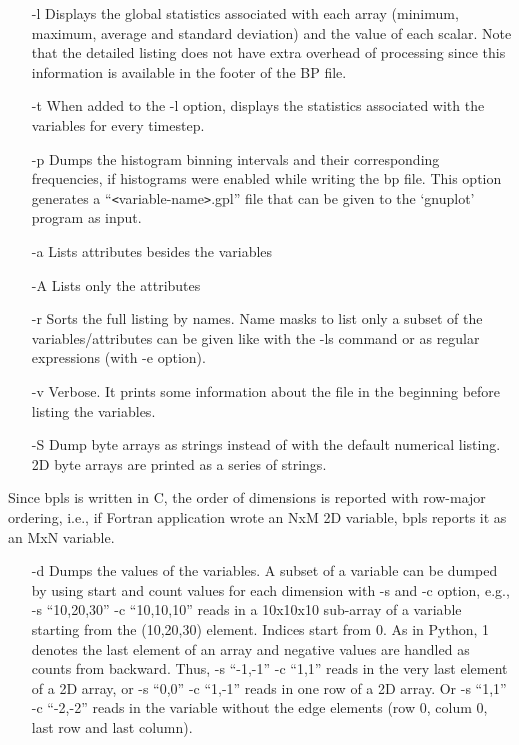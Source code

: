 \begin{itemize}
\item[-l]  Displays the global statistics associated with each array (minimum, maximum, 
average and standard deviation) and the value of each scalar. Note that the detailed 
listing does not have extra overhead of processing since this information is available 
in the footer of the BP file. 

\item[-t]  When added to the -l option, displays the statistics associated with the variables 
for every timestep. 

\item[-p] Dumps the histogram binning intervals and their corresponding frequencies, if 
histograms were enabled while writing the bp file. This option generates a ``\texttt{<}variable-name\texttt{>}.gpl'' 
file that can be given to the `gnuplot' program as input. 

\item[-a] Lists attributes besides the variables

\item[-A] Lists only the attributes

\item[-r] Sorts the full listing by names. Name masks to list only a subset of the variables/attributes 
can be given like with the -ls command or as regular expressions (with -e option).

\item[-v] Verbose. It prints some information about the file in the beginning before listing 
the variables. 

\item[-S] Dump byte arrays as strings instead of with the default numerical listing. 2D 
byte arrays are printed as a series of strings. 
\end{itemize}

Since bpls is written in C, the order of dimensions is reported with row-major 
ordering, i.e., if Fortran application wrote an NxM 2D variable, bpls reports it 
as an MxN variable. 

\begin{itemize}
\item[-d] Dumps the values of the variables. A subset of a variable can be dumped by using 
start and count values for each dimension with -s and -c option, e.g., -s ``10,20,30'' 
-c ``10,10,10'' reads in a 10x10x10 sub-array of a variable starting from the (10,20,30) 
element. Indices start from 0. As in Python, \-{}1 denotes the last element of 
an array and negative values are handled as counts from backward. Thus, -s ``-1,-1'' 
-c ``1,1'' reads in the very last element of a 2D array, or -s ``0,0'' -c ``1,-1'' 
reads in one row of a 2D array. Or -s ``1,1'' -c ``-2,-2'' reads in the variable 
without the edge elements (row 0, colum 0, last row and last column).
\end{itemize}

